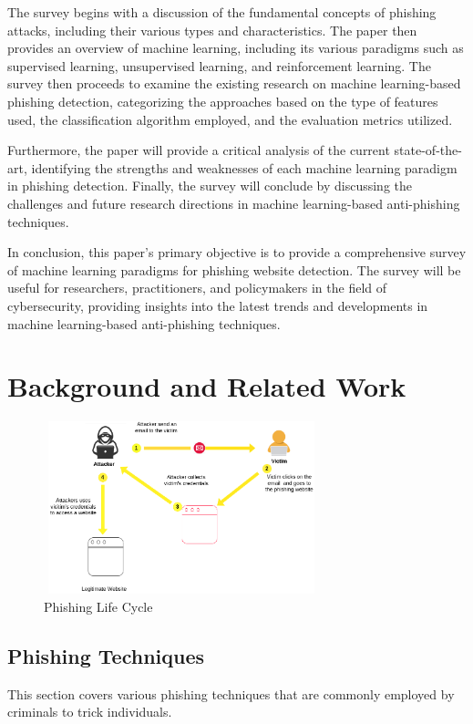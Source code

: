 \documentclass[final]{cvpr}
\begin{document}
The survey begins with a discussion of the fundamental concepts of phishing attacks, including their various types and characteristics. The paper then provides an overview of machine learning, including its various paradigms such as supervised learning, unsupervised learning, and reinforcement learning. The survey then proceeds to examine the existing research on machine learning-based phishing detection, categorizing the approaches based on the type of features used, the classification algorithm employed, and the evaluation metrics utilized.

Furthermore, the paper will provide a critical analysis of the current state-of-the-art, identifying the strengths and weaknesses of each machine learning paradigm in phishing detection. Finally, the survey will conclude by discussing the challenges and future research directions in machine learning-based anti-phishing techniques.

In conclusion, this paper's primary objective is to provide a comprehensive survey of machine learning paradigms for phishing website detection. The survey will be useful for researchers, practitioners, and policymakers in the field of cybersecurity, providing insights into the latest trends and developments in machine learning-based anti-phishing techniques.


\section{Background and Related Work}

\hspace*{-0.2in}
\begin{figure}[h]
   \centering
   \includegraphics[width=8cm, height=5cm]{phishing-life-cycle.png}
   \caption{Phishing Life Cycle}
\end{figure}

\subsection{Phishing Techniques}
This section covers various phishing techniques that are commonly employed by criminals to trick individuals.
\end{document}
